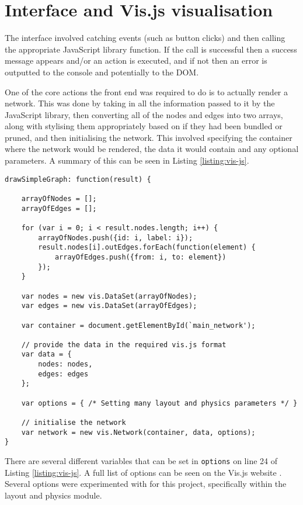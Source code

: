\documentclass[../dissertation.tex]{subfiles}
\begin{document}
\section{Interface and Vis.js visualisation}

The interface involved catching events (such as button clicks) and then calling the appropriate JavaScript library function. If the call is successful then a success message appears and/or an action is executed, and if not then an error is outputted to the console and potentially to the DOM. 

One of the core actions the front end was required to do is to actually render a network. This was done by taking in all the information passed to it by the JavaScript library, then converting all of the nodes and edges into two arrays, along with stylising them appropriately based on if they had been bundled or pruned, and then initialising the network. This involved specifying the container where the network would be rendered, the data it would contain and any optional parameters. A summary of this can be seen in Listing \ref{listing:vis-js}.

\begin{lstlisting}[caption=How to create a network using Vis.js, label=listing:vis-js]
drawSimpleGraph: function(result) {

    arrayOfNodes = [];
    arrayOfEdges = [];
    
    for (var i = 0; i < result.nodes.length; i++) {
        arrayOfNodes.push({id: i, label: i});
        result.nodes[i].outEdges.forEach(function(element) {
            arrayOfEdges.push({from: i, to: element})
        });
    }
    
    var nodes = new vis.DataSet(arrayOfNodes);
    var edges = new vis.DataSet(arrayOfEdges);
    
    var container = document.getElementById(`main_network');
    
    // provide the data in the required vis.js format
    var data = {
        nodes: nodes,
        edges: edges
    };
    
    var options = { /* Setting many layout and physics parameters */ }
    
    // initialise the network
    var network = new vis.Network(container, data, options);
}
\end{lstlisting}

There are several different variables that can be set in \texttt{options} on line 24 of Listing \ref{listing:vis-js}. A full list of options can be seen on the Vis.js website \cite{visjsoptions}. Several options were experimented with for this project, specifically within the layout and physics module. 
\end{document}
